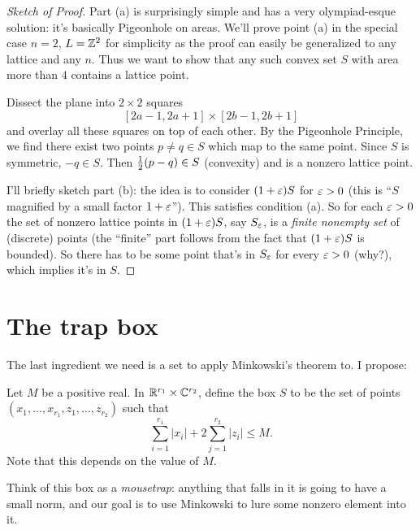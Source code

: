 \begin{proof}[Sketch of Proof]
	Part (a) is surprisingly simple and has a very olympiad-esque solution: it's basically Pigeonhole on areas.
	We'll prove point (a) in the special case $n=2$, $L = \mathbb Z^2$ for simplicity as the proof
	can easily be generalized to any lattice and any $n$.
	Thus we want to show that any such convex set $S$ with area more than $4$ contains a lattice point.

	Dissect the plane into $2 \times 2$ squares 
	\[ [2a-1, 2a+1] \times [2b-1, 2b+1] \]
	and overlay all these squares on top of each other.
	By the Pigeonhole Principle, we find there exist two points $p \neq q \in S$ which map to the same point.
	Since $S$ is symmetric, $-q \in S$. Then $\frac{1}{2} (p-q) \in S$ (convexity) and is a nonzero lattice point.

	I'll briefly sketch part (b): the idea is to consider $(1+\varepsilon) S$ for $\varepsilon > 0$
	(this is ``$S$ magnified by a small factor $1+\varepsilon$'').
	This satisfies condition (a). So for each $\varepsilon > 0$ the set of nonzero lattice points in $(1+\varepsilon) S$,
	say $S_\varepsilon$, is a \emph{finite nonempty set} of (discrete) points
	(the ``finite'' part follows from the fact that $(1+\varepsilon)S$ is bounded).
	So there has to be some point that's in $S_\varepsilon$ for every $\varepsilon > 0$ (why?), which implies it's in $S$.
\end{proof}

\section{The trap box}
The last ingredient we need is a set to apply Minkowski's theorem to.  I propose:
\begin{definition}
	Let $M$ be a positive real.
	In $\mathbb R^{r_1} \times \mathbb C^{r_2}$, define the box $S$ to be the
	set of points $(x_1, \dots, x_{r_1}, z_1, \dots, z_{r_2})$ such that
	\[
		\sum_{i=1}^{r_1} \left\lvert x_i \right\rvert
		+ 2 \sum_{j=1}^{r_2} \left\lvert z_i \right\rvert
		\le M. 
	\]
	Note that this depends on the value of $M$.
\end{definition}

Think of this box as a \emph{mousetrap}: anything that falls in it is going to have a small norm,
and our goal is to use Minkowski to lure some nonzero element into it.


